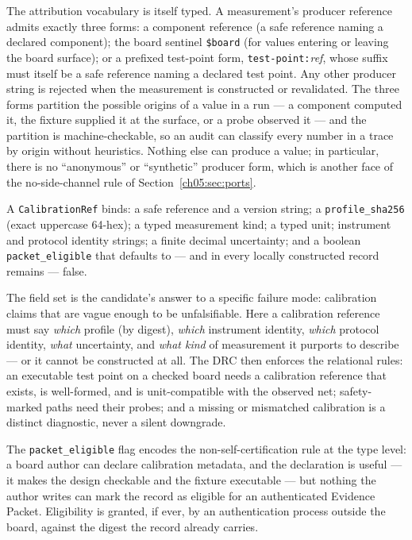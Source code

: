 The attribution vocabulary is itself typed. A measurement's producer
reference admits exactly three forms: a component reference (a safe
reference naming a declared component); the board sentinel
\texttt{\$board} (for values entering or leaving the board surface); or
a prefixed test-point form, \texttt{test-point:}\emph{ref}, whose
suffix must itself be a safe reference naming a declared test point.
Any other producer string is rejected when the measurement is
constructed or revalidated. The three forms partition the possible
origins of a value in a run --- a component computed it, the fixture
supplied it at the surface, or a probe observed it --- and the
partition is machine-checkable, so an audit can classify every number
in a trace by origin without heuristics. Nothing else can produce a
value; in particular, there is no ``anonymous'' or ``synthetic''
producer form, which is another face of the no-side-channel rule of
Section~\ref{ch05:sec:ports}.

\begin{definition}
\label{ch05:def:calref}
A \texttt{CalibrationRef} binds: a safe reference and a version string;
a \texttt{profile\_sha256} (exact uppercase 64-hex); a typed measurement
kind; a typed unit; instrument and protocol identity strings; a finite
decimal uncertainty; and a boolean \texttt{packet\_eligible} that
defaults to --- and in every locally constructed record remains ---
false.
\end{definition}

The field set is the candidate's answer to a specific failure mode:
calibration claims that are vague enough to be unfalsifiable. Here a
calibration reference must say \emph{which} profile (by digest),
\emph{which} instrument identity, \emph{which} protocol identity,
\emph{what} uncertainty, and \emph{what kind} of measurement it purports
to describe --- or it cannot be constructed at all. The DRC then enforces
the relational rules: an executable test point on a checked board needs a
calibration reference that exists, is well-formed, and is unit-compatible
with the observed net; safety-marked paths need their probes; and a
missing or mismatched calibration is a distinct diagnostic, never a
silent downgrade.

The \texttt{packet\_eligible} flag encodes the non-self-certification
rule at the type level: a board author can declare calibration metadata,
and the declaration is useful --- it makes the design checkable and the
fixture executable --- but nothing the author writes can mark the record
as eligible for an authenticated Evidence Packet. Eligibility is granted,
if ever, by an authentication process outside the board, against the
digest the record already carries.

